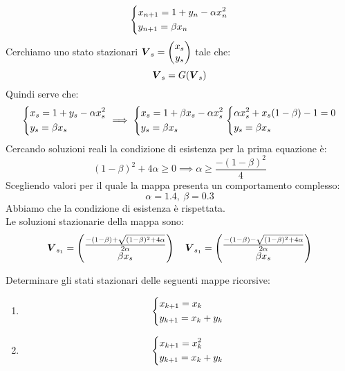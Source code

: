 \begin{exmp}
   \[\begin{dcases}
       x_{n+1}=1+y_n - \alpha x_n^2\\
       y_{n+1}=\beta x_n
   \end{dcases}\]  
   Cerchiamo uno stato stazionari $\boldsymbol{V}_s = \begin{pmatrix} x_s \\ y_s \end{pmatrix} $ tale che:
   \[
       \boldsymbol{V}_s = G(\boldsymbol{V}_s)
   \] 
   Quindi serve che:
   \[\begin{dcases}
       x_{s}=1+y_s - \alpha x_s^2\\
       y_{s}=\beta x_s
   \end{dcases}
   \implies 
   \begin{dcases}
       x_s = 1 + \beta x_s - \alpha x_s^2\\
       y_s = \beta x_s
   \end{dcases}
   \begin{dcases}
       \alpha x_s^2 + x_s(1-\beta)-1 = 0\\
       y_s = \beta x_s
   \end{dcases}
   \] 
   Cercando soluzioni reali la condizione di esistenza per la prima equazione è:
   \[
       (1-\beta)^2 + 4\alpha  \ge 0 \implies  \alpha  \ge \frac{-(1-\beta)^2}{4}
   \] 
   Scegliendo valori per il quale la mappa presenta un comportamento complesso:
   \[
       \alpha  = 1.4, \ \beta  = 0.3
   \] 
   Abbiamo che la condizione di esistenza è rispettata.\\
   Le soluzioni stazionarie della mappa sono:
   \[
       \boldsymbol{V}_{s_1}= \begin{pmatrix} \frac{-(1-\beta)+ \sqrt{(1-\beta)^2+4\alpha} }{2\alpha}\\ \beta x_s \end{pmatrix} \quad
       \boldsymbol{V}_{s_1}= \begin{pmatrix} \frac{-(1-\beta)- \sqrt{(1-\beta)^2+4\alpha} }{2\alpha}\\ \beta x_s \end{pmatrix} 
   \] 
\end{exmp}
\noindent
\begin{ex}
    Determinare gli stati stazionari delle seguenti mappe ricorsive:
    \begin{enumerate}
        \item 
	    \[\begin{dcases}
	        x_{k+1}=x_k\\
		y_{k+1}=x_k + y_k
	    \end{dcases}\] 
	\item
	    \[\begin{dcases}
	        x_{k+1}=x_k^2\\
		y_{k+1}=x_k + y_k
	    \end{dcases}\] 
    \end{enumerate}
\end{ex}
\noindent
